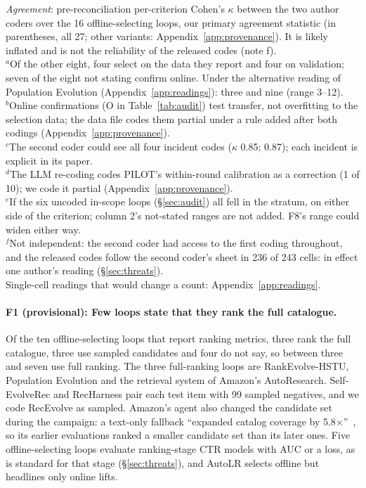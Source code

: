 \documentclass[sigconf,nonacm]{acmart}
\newcommand{\po}{\textsf{O}\xspace}
\begin{document}
\begin{table}[t]
\smallskip\raggedright\footnotesize
\emph{Agreement}: pre-reconciliation per-criterion Cohen's $\kappa$ between the two author coders over the 16 offline-selecting loops, our primary agreement statistic (in parentheses, all 27; other variants: Appendix~\ref{app:provenance}). It is likely inflated and is not the reliability of the released codes (note f).\\
$^a$Of the other eight, four select on the data they report and four on validation; seven of the eight not stating confirm online. Under the alternative reading of Population Evolution (Appendix~\ref{app:readings}): three and nine (range 3--12).\\
$^b$Online confirmations (\po in Table~\ref{tab:audit}) test transfer, not overfitting to the selection data; the data file codes them partial under a rule added after both codings (Appendix~\ref{app:provenance}).\\
$^c$The second coder could see all four incident codes ($\kappa$ 0.85; 0.87); each incident is explicit in its paper.\\
$^d$The LLM re-coding codes PILOT's within-round calibration as a correction (1 of 10); we code it partial (Appendix~\ref{app:provenance}).\\
$^e$If the six uncoded in-scope loops (\S\ref{sec:audit}) all fell in the stratum, on either side of the criterion; column 2's not-stated ranges are not added. F8's range could widen either way.\\
$^f$Not independent: the second coder had access to the first coding throughout, and the released codes follow the second coder's sheet in 236 of 243 cells: in effect one author's reading (\S\ref{sec:threats}).\\
Single-cell readings that would change a count: Appendix~\ref{app:readings}.
\end{table}

\paragraph{F1 (provisional): Few loops state that they rank the full catalogue.} Of the ten offline-selecting loops that report ranking
metrics, three rank the full catalogue, three use sampled candidates and four do not say, so between three and seven
use full ranking. The three full-ranking loops are RankEvolve-HSTU, Population Evolution and the retrieval system of
Amazon's AutoResearch. Self-EvolveRec and RecHarness pair each test item with 99 sampled negatives, and we code RecEvolve as sampled. Amazon's agent also changed the candidate set during the campaign: a
text-only fallback ``expanded catalog coverage by 5.8$\times$''~\cite{chandran2026autoresearch}, so its earlier evaluations ranked a smaller candidate set than its later ones. Five offline-selecting loops evaluate ranking-stage CTR models with AUC
or a loss, as is standard for that stage (\S\ref{sec:threats}), and AutoLR selects offline but headlines only online lifts.
\end{document}
